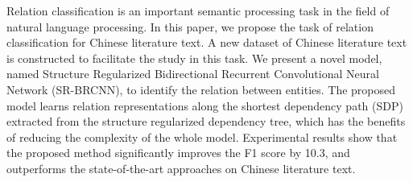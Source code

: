 Relation classification is an important semantic processing task in the field of natural language processing. In this paper, we propose the task of relation classification for Chinese literature text. A new dataset of Chinese literature text is constructed to facilitate the study in this task. We present a novel model, named Structure Regularized Bidirectional Recurrent Convolutional Neural Network (SR-BRCNN), to identify the relation between entities. The proposed model learns relation representations along the shortest dependency path (SDP) extracted from the structure regularized dependency tree, which has the benefits of reducing the complexity of the whole model. Experimental results show that the proposed method significantly improves the F1 score by 10.3, and outperforms the state-of-the-art approaches on Chinese literature text.
